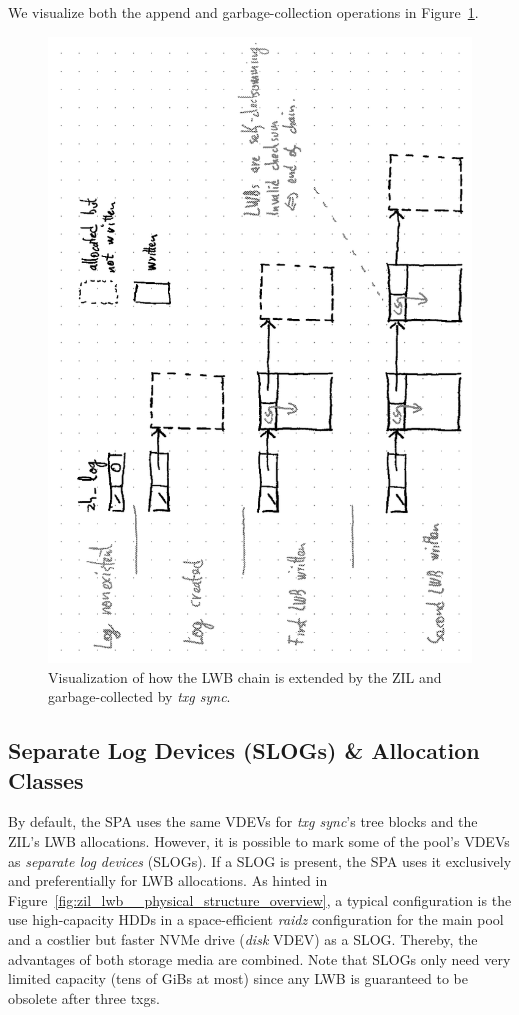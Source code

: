 \documentclass[12pt,a4paper,twoside]{book}
\begin{document}
We visualize both the append and garbage-collection operations in Figure~\ref{fig:zil_lwb__physical_structure_append}.

\begin{figure}[H]
    \centering
    \includegraphics{fig/zil_lwb__physical_structure_append}
    \caption{Visualization of how the LWB chain is extended by the ZIL and garbage-collected by \textit{txg sync}.
    }
    \label{fig:zil_lwb__physical_structure_append}
\end{figure}

\subsection{Separate Log Devices (SLOGs) \& Allocation Classes}

By default, the SPA uses the same VDEVs for \textit{txg sync}'s tree blocks and the ZIL's LWB allocations.
However, it is possible to mark some of the pool's VDEVs as \textit{separate log devices} (SLOGs).
If a SLOG is present, the SPA uses it exclusively and preferentially for LWB allocations.
As hinted in Figure~\ref{fig:zil_lwb__physical_structure_overview}, a typical configuration is the use high-capacity HDDs in a space-efficient \textit{raidz} configuration for the main pool and a costlier but faster NVMe drive (\textit{disk} VDEV) as a SLOG.
Thereby, the advantages of both storage media are combined.
Note that SLOGs only need very limited capacity (tens of GiBs at most) since any LWB is guaranteed to be obsolete after three txgs.
\end{document}
